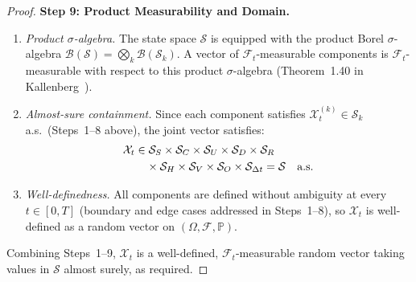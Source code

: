 \documentclass[12pt,openany]{book}
\newcommand{\calF}{\mathcal{F}}
\newcommand{\calX}{\mathcal{X}}
\numberwithin{equation}{chapter}
\theoremstyle{plain}
\theoremstyle{definition}
\theoremstyle{remark}
\numberwithin{equation}{chapter}
\theoremstyle{plain}
\begin{document}
\begin{proof}
\medskip
\noindent\textbf{Step 9: Product Measurability and Domain.}
\begin{enumerate}
  \item \emph{Product $\sigma$-algebra.}
    The state space $\mathcal{S}$ is equipped with the
    product Borel $\sigma$-algebra
    $\mathcal{B}(\mathcal{S}) =
     \bigotimes_{k} \mathcal{B}(\mathcal{S}_k)$.
    A vector of $\calF_t$-measurable components is
    $\calF_t$-measurable with respect to this product
    $\sigma$-algebra (Theorem~1.40 in
    Kallenberg~\cite{Kallenberg2002}).

  \item \emph{Almost-sure containment.}
    Since each component satisfies
    $\mathcal{X}_t^{(k)} \in \mathcal{S}_k$ a.s.\
    (Steps~1--8 above), the joint vector satisfies:
    \begin{align}
      \calX_t
        &\in \mathcal{S}_S
            \times \mathcal{S}_C
            \times \mathcal{S}_U
            \times \mathcal{S}_D
            \times \mathcal{S}_R
            \notag\\
        &\quad
            \times \mathcal{S}_H
            \times \mathcal{S}_V
            \times \mathcal{S}_O
            \times \mathcal{S}_{\Delta t}
         = \mathcal{S}
         \quad \text{a.s.}
    \end{align}

  \item \emph{Well-definedness.}
    All components are defined without ambiguity at every
    $t \in [0,T]$ (boundary and edge cases addressed in
    Steps~1--8), so $\calX_t$ is well-defined as a random
    vector on $(\Omega, \calF, \mathbb{P})$.
\end{enumerate}

\noindent
Combining Steps~1--9, $\calX_t$ is a well-defined,
$\calF_t$-measurable random vector taking values in
$\mathcal{S}$ almost surely, as required.
\end{proof}
\end{document}
